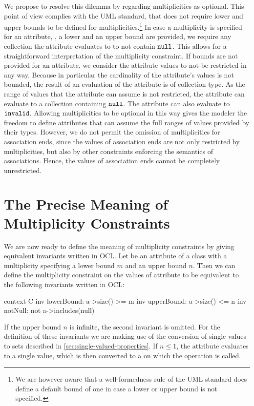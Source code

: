 We propose to resolve this dilemma by regarding multiplicities as optional. This
point of view complies with the UML standard, that does not require lower and
upper bounds to be defined for multiplicities.\footnote{We are however aware
  that a well-formedness rule of the UML standard does define a default bound
  of one in case a lower or upper bound is not specified.} In case a
multiplicity is specified for an attribute, \ie, a lower and an upper bound
are provided, we require any collection the attribute evaluates to to not
contain $\mathtt{null}$. This allows for a straightforward interpretation of
the multiplicity constraint. If bounds are not provided for an attribute, we
consider the attribute values to not be restricted in any way. Because in
particular the cardinality of the attribute's values is not bounded, the result
of an evaluation of the attribute is of collection type. As the range of values
that the attribute can assume is not restricted, the attribute can evaluate to a
collection containing $\mathtt{null}$. The attribute can also evaluate to
$\mathtt{invalid}$. Allowing multiplicities to be optional in this way gives
the modeler the freedom to define attributes that can assume the full ranges of
values provided by their types. However, we do not permit the omission of
multiplicities for association ends, since the values of association ends are
not only restricted by multiplicities, but also by other constraints enforcing
the semantics of associations. Hence, the values of association ends cannot be
completely unrestricted.

\section{The Precise Meaning of Multiplicity Constraints}
We are now ready to define the meaning of multiplicity constraints by giving
equivalent invariants written in OCL. Let  be an attribute of a
class  with a multiplicity specifying a lower bound $m$ and an
upper bound $n$. Then we can define the multiplicity constraint on the values of
attribute  to be equivalent to the following invariants written in
OCL:
\begin{ocl}
context C inv lowerBound: a->size() >= m
          inv upperBound: a->size() <= n
          inv notNull: not a->includes(null)
\end{ocl}
If the upper bound $n$ is infinite, the second invariant is omitted. For the
definition of these invariants we are making use of the conversion of single
values to sets described in \autoref{sec:single-valued-properties}. If $n
\leq 1$, the attribute  evaluates to a single value, which is then
converted to a  on which the  operation is
called.

